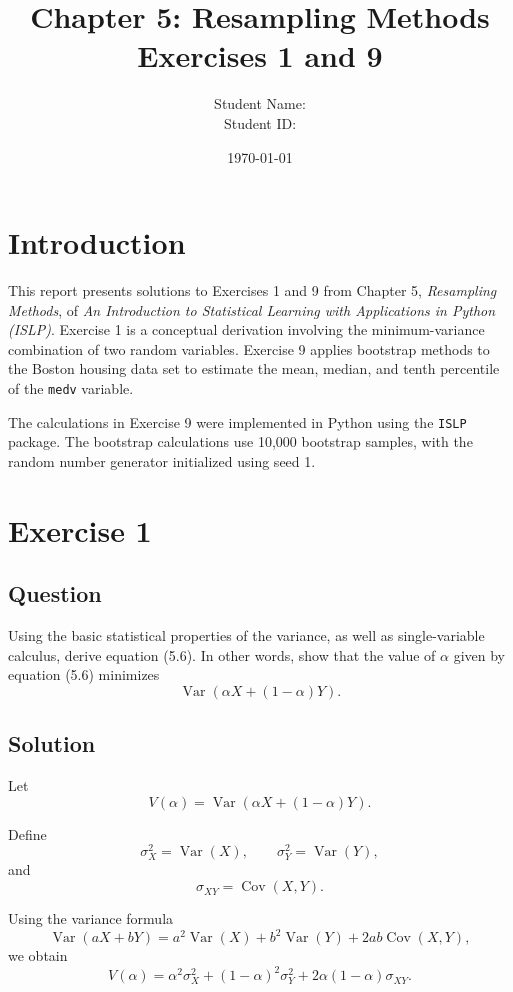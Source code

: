 \documentclass[12pt,a4paper]{article}
\title{\textbf{Chapter 5: Resampling Methods}\\
Exercises 1 and 9}
\author{Student Name: \underline{\hspace{6cm}}\\
Student ID: \underline{\hspace{6cm}}}
\date{\today}
\begin{document}
\maketitle

\section*{Introduction}

This report presents solutions to Exercises 1 and 9 from Chapter 5,
\textit{Resampling Methods}, of \textit{An Introduction to Statistical
Learning with Applications in Python (ISLP)}. Exercise 1 is a conceptual
derivation involving the minimum-variance combination of two random
variables. Exercise 9 applies bootstrap methods to the Boston housing
data set to estimate the mean, median, and tenth percentile of the
\texttt{medv} variable.

The calculations in Exercise 9 were implemented in Python using the
\texttt{ISLP} package. The bootstrap calculations use 10,000 bootstrap
samples, with the random number generator initialized using seed 1.

\section{Exercise 1}

\subsection*{Question}

Using the basic statistical properties of the variance, as well as
single-variable calculus, derive equation (5.6). In other words, show
that the value of $\alpha$ given by equation (5.6) minimizes
\[
\operatorname{Var}\left(\alpha X+(1-\alpha)Y\right).
\]

\subsection*{Solution}

Let
\[
V(\alpha)=\operatorname{Var}\left(\alpha X+(1-\alpha)Y\right).
\]

Define
\[
\sigma_X^2=\operatorname{Var}(X), \qquad
\sigma_Y^2=\operatorname{Var}(Y),
\]
and
\[
\sigma_{XY}=\operatorname{Cov}(X,Y).
\]

Using the variance formula
\[
\operatorname{Var}(aX+bY)
=
a^2\operatorname{Var}(X)
+b^2\operatorname{Var}(Y)
+2ab\operatorname{Cov}(X,Y),
\]
we obtain
\[
V(\alpha)
=
\alpha^2\sigma_X^2
+(1-\alpha)^2\sigma_Y^2
+2\alpha(1-\alpha)\sigma_{XY}.
\]
\end{document}
